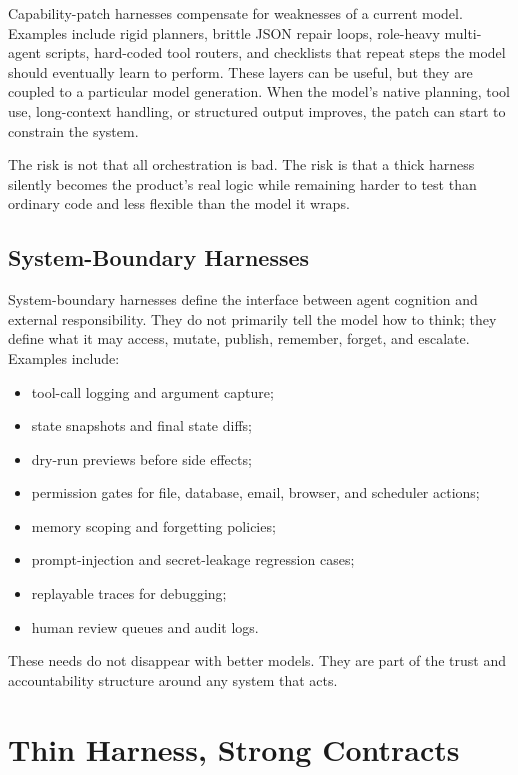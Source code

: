 \documentclass[11pt]{article}
\begin{document}
Capability-patch harnesses compensate for weaknesses of a current model. Examples include rigid planners, brittle JSON repair loops, role-heavy multi-agent scripts, hard-coded tool routers, and checklists that repeat steps the model should eventually learn to perform. These layers can be useful, but they are coupled to a particular model generation. When the model's native planning, tool use, long-context handling, or structured output improves, the patch can start to constrain the system.

The risk is not that all orchestration is bad. The risk is that a thick harness silently becomes the product's real logic while remaining harder to test than ordinary code and less flexible than the model it wraps.

\subsection{System-Boundary Harnesses}

System-boundary harnesses define the interface between agent cognition and external responsibility. They do not primarily tell the model how to think; they define what it may access, mutate, publish, remember, forget, and escalate. Examples include:

\begin{itemize}[leftmargin=*]
  \item tool-call logging and argument capture;
  \item state snapshots and final state diffs;
  \item dry-run previews before side effects;
  \item permission gates for file, database, email, browser, and scheduler actions;
  \item memory scoping and forgetting policies;
  \item prompt-injection and secret-leakage regression cases;
  \item replayable traces for debugging;
  \item human review queues and audit logs.
\end{itemize}

These needs do not disappear with better models. They are part of the trust and accountability structure around any system that acts.

\section{Thin Harness, Strong Contracts}
\end{document}
